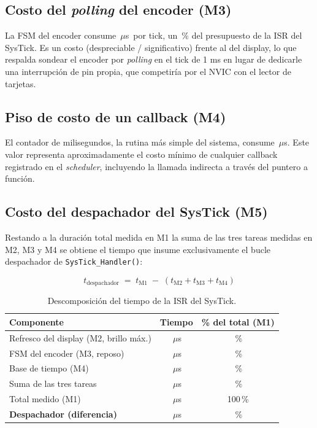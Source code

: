 \documentclass[11pt,a4paper]{article}
\newcommand{\dato}[1][2cm]{\underline{\hspace{#1}}}
\newcommand{\us}{\ensuremath{\mu}s}
\begin{document}
\subsection{Costo del \textit{polling} del encoder (M3)}

La FSM del encoder consume \dato\,\us\ por tick, un \dato\,\% del
presupuesto de la ISR del SysTick. Es un costo \dato{} (despreciable /
significativo) frente al del display, lo que respalda sondear el encoder
por \textit{polling} en el tick de 1 ms en lugar de dedicarle una
interrupción de pin propia, que competiría por el NVIC con el lector de
tarjetas.

\subsection{Piso de costo de un callback (M4)}

El contador de milisegundos, la rutina más simple del sistema, consume
\dato\,\us. Este valor representa aproximadamente el costo mínimo de
cualquier callback registrado en el \textit{scheduler}, incluyendo la
llamada indirecta a través del puntero a función.

\subsection{Costo del despachador del SysTick (M5)}

Restando a la duración total medida en M1 la suma de las tres tareas
medidas en M2, M3 y M4 se obtiene el tiempo que insume exclusivamente el
bucle despachador de \texttt{SysTick\_Handler()}:

\[
t_{\text{despachador}} \;=\; t_{\text{M1}} \;-\; \left( t_{\text{M2}} + t_{\text{M3}} + t_{\text{M4}} \right)
\]

\begin{table}[H]
\centering
\begin{tabular}{@{}lcc@{}}
\toprule
\textbf{Componente} & \textbf{Tiempo} & \textbf{\% del total (M1)} \\
\midrule
Refresco del display (M2, brillo máx.) & \dato[1.5cm]\,\us & \dato[1.3cm]\,\% \\
FSM del encoder (M3, reposo)           & \dato[1.5cm]\,\us & \dato[1.3cm]\,\% \\
Base de tiempo (M4)                    & \dato[1.5cm]\,\us & \dato[1.3cm]\,\% \\
\midrule
Suma de las tres tareas                & \dato[1.5cm]\,\us & \dato[1.3cm]\,\% \\
Total medido (M1)                      & \dato[1.5cm]\,\us & 100\,\% \\
\midrule
\textbf{Despachador (diferencia)}      & \dato[1.5cm]\,\us & \dato[1.3cm]\,\% \\
\bottomrule
\end{tabular}
\caption{Descomposición del tiempo de la ISR del SysTick.}
\label{tab:despachador-systick}
\end{table}
\end{document}
